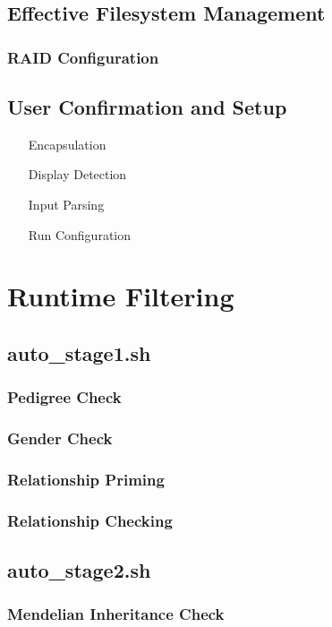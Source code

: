 \subsection{Effective Filesystem Management}
\subsubsection{RAID Configuration}

\subsection{User Confirmation and Setup}
\begin{enumerate}
\item[Encapsulation]{}
\item[Display Detection]{}
\item[Input Parsing]{}
\item[Run Configuration]{}
\end{enumerate}



\section{Runtime Filtering}

\subsection{auto\_stage1.sh}
\subsubsection{Pedigree Check}
\subsubsection{Gender Check}
\subsubsection{Relationship Priming}
\subsubsection{Relationship Checking}

\subsection{auto\_stage2.sh}
\subsubsection{Mendelian Inheritance Check}
